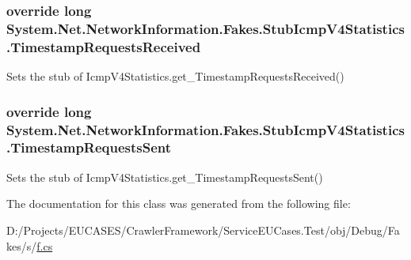 \hypertarget{class_system_1_1_net_1_1_network_information_1_1_fakes_1_1_stub_icmp_v4_statistics_a3dd5b28cd4297c04bb4a116b13627cab}{
\subsubsection[{Timestamp\-Requests\-Received}]{\setlength{\rightskip}{0pt plus 5cm}override long System.\-Net.\-Network\-Information.\-Fakes.\-Stub\-Icmp\-V4\-Statistics.\-Timestamp\-Requests\-Received\hspace{0.3cm}{\ttfamily [get]}}}\label{class_system_1_1_net_1_1_network_information_1_1_fakes_1_1_stub_icmp_v4_statistics_a3dd5b28cd4297c04bb4a116b13627cab}


Sets the stub of Icmp\-V4\-Statistics.\-get\-\_\-\-Timestamp\-Requests\-Received()

\hypertarget{class_system_1_1_net_1_1_network_information_1_1_fakes_1_1_stub_icmp_v4_statistics_ac4d695285379a758b1995503f8e5f981}{
\subsubsection[{Timestamp\-Requests\-Sent}]{\setlength{\rightskip}{0pt plus 5cm}override long System.\-Net.\-Network\-Information.\-Fakes.\-Stub\-Icmp\-V4\-Statistics.\-Timestamp\-Requests\-Sent\hspace{0.3cm}{\ttfamily [get]}}}\label{class_system_1_1_net_1_1_network_information_1_1_fakes_1_1_stub_icmp_v4_statistics_ac4d695285379a758b1995503f8e5f981}


Sets the stub of Icmp\-V4\-Statistics.\-get\-\_\-\-Timestamp\-Requests\-Sent()



The documentation for this class was generated from the following file\-:\begin{DoxyCompactItemize}
\item 
D\-:/\-Projects/\-E\-U\-C\-A\-S\-E\-S/\-Crawler\-Framework/\-Service\-E\-U\-Cases.\-Test/obj/\-Debug/\-Fakes/s/\hyperlink{s_2f_8cs}{f.\-cs}\end{DoxyCompactItemize}
